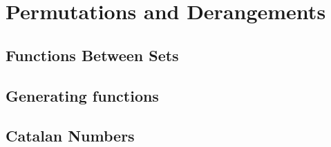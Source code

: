 \documentclass{article}
\begin{document}
\section{Permutations and Derangements}
\begingroup
  \renewcommand{\section}{\subsection}
  
\endgroup


\section{Functions Between Sets}
\begingroup
  \let\maketitle\relax
  
\endgroup

\section{Generating functions}
\begingroup
  \renewcommand{\section}{\subsection}
  
\endgroup





\section{Catalan Numbers}
\begingroup
  \renewcommand{\section}{\subsection}
  
\endgroup

\newpage             %
\tableofcontents
\clearpage 
\end{document}
